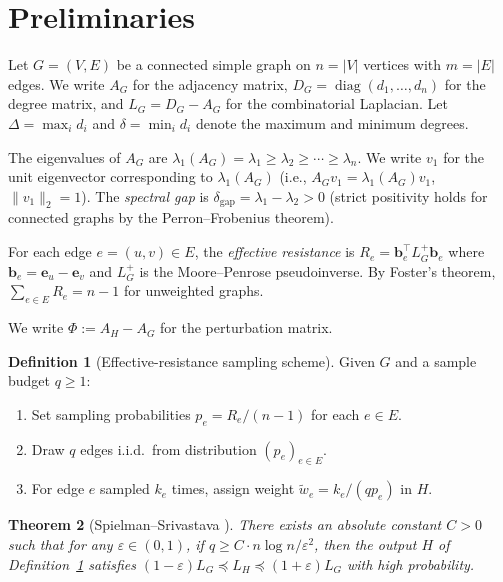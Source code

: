 \documentclass[11pt]{article}
\newtheorem{theorem}{Theorem}[section]
\theoremstyle{definition}
\newtheorem{definition}[theorem]{Definition}
\newcommand{\eps}{\varepsilon}
\newcommand{\lamG}{\lambda_1(A_G)}
\newcommand{\AG}{A_G}
\newcommand{\AH}{A_H}
\newcommand{\LG}{L_G}
\newcommand{\LH}{L_H}
\newcommand{\be}{\mathbf{e}}
\newcommand{\bb}{\mathbf{b}}
\newcommand{\vone}{v_1}
\begin{document}
\section{Preliminaries}\label{sec:prelim}

Let $G = (V, E)$ be a connected simple graph on $n = |V|$ vertices with
$m = |E|$ edges. We write $\AG$ for the adjacency matrix,
$D_G = \operatorname{diag}(d_1, \ldots, d_n)$ for the degree matrix, and
$\LG = D_G - \AG$ for the combinatorial Laplacian. Let $\Delta = \max_i d_i$
and $\delta = \min_i d_i$ denote the maximum and minimum degrees.

The eigenvalues of $\AG$ are $\lamG = \lambda_1 \geq \lambda_2 \geq \cdots \geq \lambda_n$.
We write $\vone$ for the unit eigenvector corresponding to $\lamG$
(i.e., $\AG \vone = \lamG \vone$, $\|\vone\|_2 = 1$). The \emph{spectral gap}
is $\delta_{\mathrm{gap}} = \lambda_1 - \lambda_2 > 0$ (strict positivity holds
for connected graphs by the Perron--Frobenius theorem).

For each edge $e = (u,v) \in E$, the \emph{effective resistance} is
$R_e = \bb_e^\top \LG^+ \bb_e$ where $\bb_e = \be_u - \be_v$ and $\LG^+$ is
the Moore--Penrose pseudoinverse. By Foster's theorem,
$\sum_{e \in E} R_e = n - 1$ for unweighted graphs.

We write $\Phi := \AH - \AG$ for the perturbation matrix.

\begin{definition}[Effective-resistance sampling scheme]\label{def:ss}
Given $G$ and a sample budget $q \geq 1$:
\begin{enumerate}[nosep]
\item Set sampling probabilities $p_e = R_e / (n-1)$ for each $e \in E$.
\item Draw $q$ edges i.i.d.\ from distribution $(p_e)_{e \in E}$.
\item For edge $e$ sampled $k_e$ times, assign weight $\tilde{w}_e = k_e / (q p_e)$ in $H$.
\end{enumerate}
\end{definition}

\begin{theorem}[Spielman--Srivastava {\citep{spielman2011graph}}]\label{thm:ss}
There exists an absolute constant $C > 0$ such that for any $\eps \in (0,1)$,
if $q \geq C \cdot n\log n / \eps^2$, then the output $H$ of
Definition~\ref{def:ss} satisfies
$(1-\eps)\LG \preceq \LH \preceq (1+\eps)\LG$ with high probability.
\end{theorem}
\end{document}
